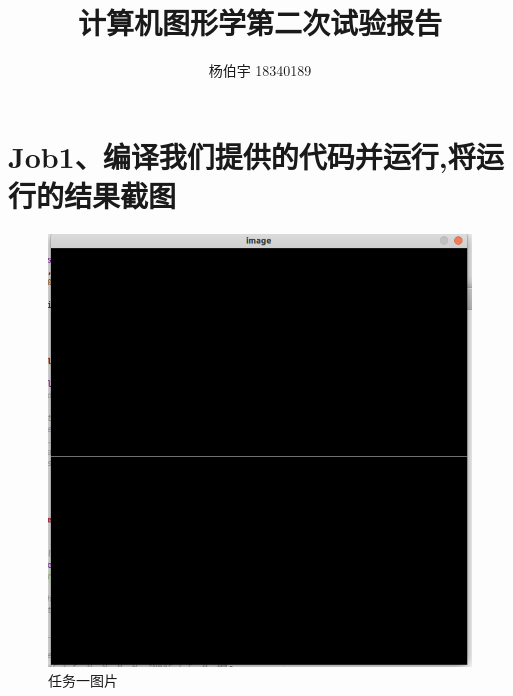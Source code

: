 \documentclass[a4paper,12pt]{article}
\title{计算机图形学第二次试验报告}
\author{杨伯宇 18340189}
\begin{document}
\maketitle

\tableofcontents
\newpage


\section{\kaishu Job1、编译我们提供的代码并运行,将运行的结果截图}
\begin{figure}[H]
    \centering
    \includegraphics[width=1\textwidth]{job1.png}
    \caption{任务一图片}
\end{figure}
\end{document}
